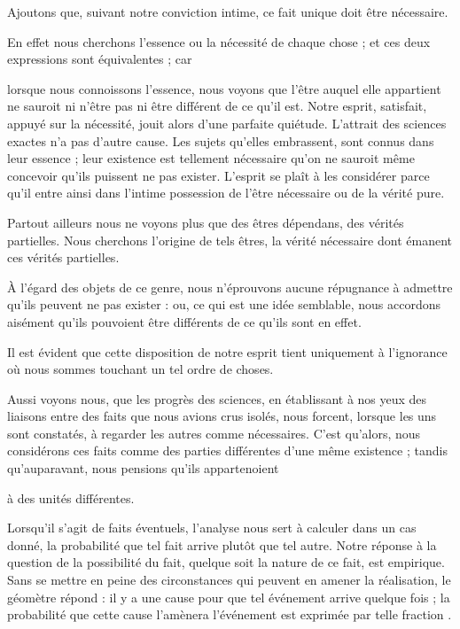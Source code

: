 \documentclass[11pt,a4paper]{article}
\begin{document}
Ajoutons que, suivant notre conviction intime, ce fait unique doit être
nécessaire.

 En effet nous cherchons l'essence ou la nécessité de chaque
chose ; et ces deux  expressions sont
équivalentes ; car

lorsque nous connoissons l'essence, nous voyons que l'être auquel elle
appartient ne sauroit ni n'être pas ni être différent de ce qu'il est.
Notre esprit, satisfait, appuyé sur la nécessité, jouit alors d'une
parfaite quiétude. L'attrait des sciences exactes n'a pas d'autre cause.
Les sujets qu'elles embrassent, sont connus dans leur essence ; leur
existence est tellement nécessaire qu'on ne  sauroit même
concevoir qu'ils puissent ne pas exister. L'esprit se plaît à les
considérer parce qu'il entre ainsi dans l'intime possession de l'être
nécessaire ou de la vérité pure.

Partout ailleurs nous ne voyons plus que des êtres dépendans, des vérités
partielles. Nous cherchons  l'origine de tels êtres, la
vérité nécessaire dont  émanent ces vérités
partielles.

À l'égard des objets de ce genre, nous n'éprouvons aucune répugnance à
admettre qu'ils peuvent ne pas exister : ou, ce qui est une idée
semblable, nous accordons aisément qu'ils pouvoient être différents de ce
qu'ils sont en effet.

Il est évident que cette disposition de notre esprit tient uniquement à
l'ignorance où nous sommes touchant un tel ordre de choses.

Aussi voyons nous,  que les progrès des sciences, en
établissant à nos yeux des liaisons entre des faits que nous avions crus
isolés, nous forcent, lorsque les uns sont constatés, à regarder les
autres comme nécessaires. C'est 
qu'alors, nous  considérons ces faits comme des parties
différentes d'une même existence ; tandis qu'auparavant, nous pensions
qu'ils appartenoient

à des unités différentes.

Lorsqu'il s'agit de faits éventuels, l'analyse nous sert à calculer dans
un cas donné, la probabilité que tel fait arrive plutôt que tel autre.
Notre réponse à la question de  la possibilité du
fait, quelque soit la nature de ce fait, est empirique. Sans se mettre en
peine des circonstances qui peuvent en amener la réalisation, le géomètre
répond : il y a une cause pour que tel événement arrive quelque fois ;
la probabilité que cette cause l'amènera  l'événement
est exprimée par  telle fraction .
\end{document}
